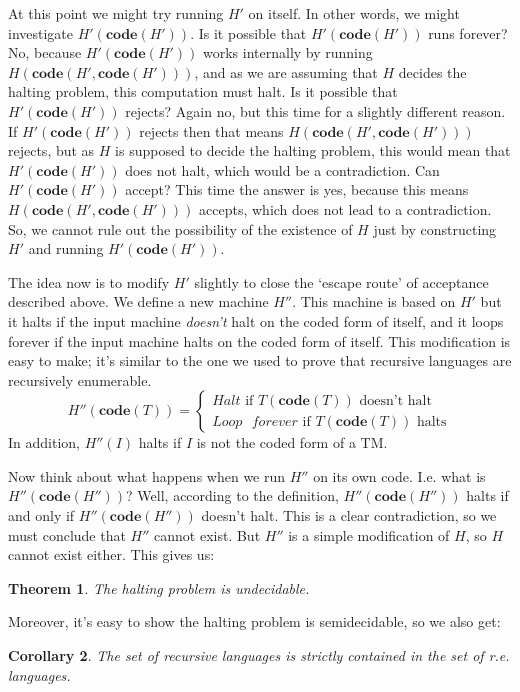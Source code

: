 \documentclass{article}
\theoremstyle{plain}
\newtheorem{theorem}{Theorem}[section]{\bfseries}{\itshape}
\newtheorem{corollary}[theorem]{Corollary}{\bfseries}{\upshape}
\theoremstyle{definition}
\newcommand{\co}{\mathbf{code}}
\begin{document}
At this point we might try running $H'$ on itself. In other words, we might investigate $H'(\co(H'))$. Is it possible that $H'(\co(H'))$ runs forever? No, because $H'(\co(H'))$ works internally by running $H(\co(H',\co(H')))$, and as we are assuming that $H$ decides the halting problem, this computation must halt. Is it possible that $H'(\co(H'))$ rejects? Again no, but this time for a slightly different reason. If $H'(\co(H'))$ rejects then that means $H(\co(H',\co(H')))$ rejects, but as $H$ is supposed to decide the halting problem, this would mean that $H'(\co(H'))$ does not halt, which would be a contradiction. Can $H'(\co(H'))$ accept? This time the answer is yes, because this means $H(\co(H',\co(H')))$ accepts, which does not lead to a contradiction. So, we cannot rule out the possibility of the existence of $H$ just by constructing $H'$ and running $H'(\co(H'))$.

The idea now is to modify $H'$ slightly to close the `escape route' of acceptance described above. We define a new machine $H''$. This machine is based on $H'$ but it halts if the input machine \emph{doesn't} halt on the coded form of itself, and it loops forever if the input machine halts on the coded form of itself. This modification is easy to make; it's similar to the one we used to prove that recursive languages are recursively enumerable. 
\[H''(\co(T))=\begin{cases}Halt \text{ if } T(\co(T)) \text{ doesn't halt}\\ Loop\text{ }forever \text{ if } T(\co(T)) \text{ halts}\end{cases}\]
In addition, $H''(I)$ halts if $I$ is not the coded form of a TM.

Now think about what happens when we run $H''$ on its own code. I.e. what is $H''(\co(H''))$? Well, according to the definition, $H''(\co(H''))$ halts if and only if $H''(\co(H''))$ doesn't halt. This is a clear contradiction, so we must conclude that $H''$ cannot exist. But $H''$ is a simple modification of $H$, so $H$ cannot exist either. This gives us:

\begin{theorem}
The halting problem is undecidable.
\end{theorem}
 
Moreover, it's easy to show the halting problem is semidecidable, so we also get:

\begin{corollary}
The set of recursive languages is strictly contained in the set of r.e. languages.
\end{corollary}
\end{document}
